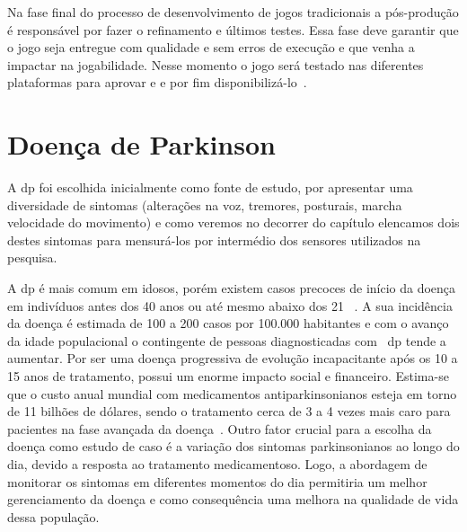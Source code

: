 Na fase final do processo de desenvolvimento de jogos tradicionais a pós-produção é responsável por fazer o refinamento e últimos testes. Essa fase deve garantir que o jogo seja entregue com qualidade e sem erros de execução e que venha a impactar na jogabilidade. Nesse momento o jogo será testado nas diferentes plataformas para aprovar e e por fim disponibilizá-lo~\cite{keith2010agile}.

\section{Doença de Parkinson}\label{section:doenca_parkinson}
A \ac{dp} foi escolhida inicialmente como fonte de estudo, por apresentar uma diversidade de sintomas (alterações na voz, tremores, posturais, marcha velocidade do movimento) e como veremos no decorrer do capítulo elencamos dois destes sintomas para mensurá-los por intermédio dos sensores utilizados na pesquisa.

A \ac{dp} é mais comum em idosos, porém existem casos precoces de início da doença em indivíduos antes dos 40 anos ou até mesmo abaixo dos 21 ~\cite{menezes2003}. A sua incidência da doença é estimada de 100 a 200 casos por 100.000 habitantes e com o avanço da idade populacional o contingente de pessoas diagnosticadas com ~\ac{dp} tende a aumentar. Por ser uma doença progressiva de evolução incapacitante após os 10 a 15 anos de tratamento, possui um enorme impacto social e financeiro. Estima-se que o custo anual mundial com medicamentos antiparkinsonianos esteja em torno de 11 bilhões de dólares, sendo o tratamento cerca de 3 a 4 vezes mais caro para pacientes na fase avançada da doença~\cite{protpar010}. Outro fator crucial para a escolha da doença como estudo de caso é a variação dos sintomas parkinsonianos ao longo do dia, devido a resposta ao tratamento medicamentoso. Logo, a abordagem de monitorar os sintomas em diferentes momentos do dia permitiria um melhor gerenciamento da doença e como consequência uma melhora na qualidade de vida dessa população.

